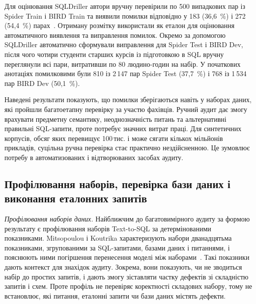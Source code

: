 \documentclass[a4paper,14pt,oneside]{extreport}
\begin{document}
Для оцінювання SQLDriller автори вручну перевірили по 500 випадкових пар із Spider Train і BIRD Train та виявили помилки відповідно у 183 (36,6~\%) і 272 (54,4~\%) парах~\cite{yang2025sqldriller}. Отриману розмітку використали як еталон для оцінювання автоматичного виявлення та виправлення помилок. Окремо за допомогою SQLDriller автоматично сформували виправлення для Spider Test і BIRD Dev, після чого чотири студенти старших курсів із підготовкою в SQL вручну переглянули всі пари, витративши по 80 людино-годин на набір. У початкових анотаціях помилковими були 810 із 2\,147 пар Spider Test (37,7~\%) і 768 із 1\,534 пар BIRD Dev (50,1~\%).

Наведені результати показують, що помилки зберігаються навіть у наборах даних, які пройшли багатоетапну перевірку за участю фахівців. Ручний аудит дає змогу врахувати предметну семантику, неоднозначність питань та альтернативні правильні SQL-запити, проте потребує значних витрат праці. Для синтетичних корпусів, обсяг яких перевищує 100\,тис. і може сягати кількох мільйонів прикладів, суцільна ручна перевірка стає практично нездійсненною. Це зумовлює потребу в автоматизованих і відтворюваних засобах аудиту.

\subsection{Профілювання наборів, перевірка бази даних і виконання еталонних запитів}
\label{subsec:rule-based-audit}

\textit{Профілювання наборів даних.}
Найближчим до багатовимірного аудиту за формою результату є профілювання наборів Text-to-SQL за детермінованими показниками. Mitsopoulou і Koutrika характеризують набори дванадцятьма показниками, згрупованими за SQL-запитами, базами даних і питаннями, і пояснюють ними погіршення перенесення моделі між наборами~\cite{mitsopoulou2025analysis}. Такі показники дають контекст для знахідок аудиту. Зокрема, вони показують, чи не зводиться набір до простих запитів, і дають змогу зіставляти частку дефектів зі складністю запитів і схем. Проте профіль не перевіряє коректності складових набору, тому не встановлює, які питання, еталонні запити чи бази даних містять дефекти.
\end{document}
